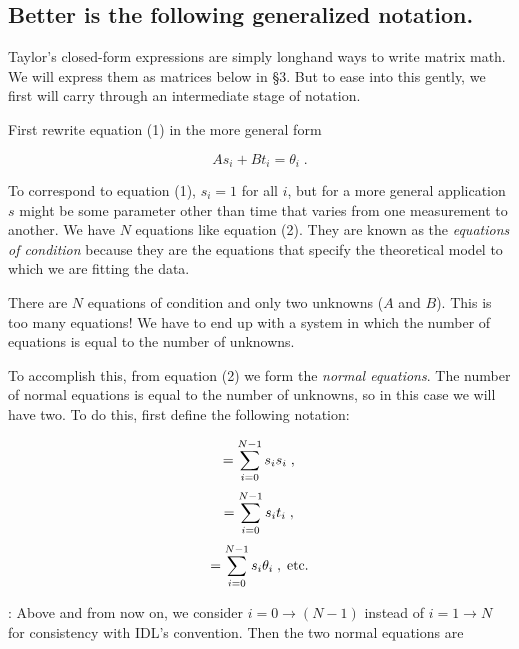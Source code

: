 \subsection{Better is the following generalized notation.}

	Taylor's closed-form expressions are simply longhand ways to
write matrix math.  We will express them as matrices below in \S 3.  But
to ease into this gently, we first will carry through an intermediate
stage of notation. 

	First rewrite equation (1) in the more general form

\begin{equation}
A s_i + B t_i = \theta_i \; .
\end{equation}

\noindent To correspond to equation (1), $s_i = 1$ for all $i$, but for
a more general application $s$ might be some parameter other than time
that varies from one measurement to another.  We have $N$ equations like
equation (2).  They are known as the {\it equations of condition}
because they are the equations that specify the theoretical model to
which we are fitting the data. 

	There are $N$ equations of condition and only two unknowns ($A$
and $B$).  This is too many equations! We have to end up with a system
in which the number of equations is equal to the number of unknowns.

	To accomplish this, from equation (2) we form the {\it normal
equations}.  The number of normal equations is equal to the number of
unknowns, so in this case we will have two.  To do this, first define
the following notation:

\begin{mathletters}
\label{sseqn}
\begin{equation} 
[ss] = \sum_{i=0}^{N-1} s_i s_i \;, \\ 
\end{equation} 
\begin{equation} [st] = \sum_{i=0}^{N-1} s_i t_i \; , \\
\end{equation} 
\begin{equation} [s\theta] = \sum_{i=0}^{N-1} s_i \theta_i \;, \; {\rm etc.} 
\end{equation} 
\end{mathletters}

: Above and from now on, we consider $i = 0
\rightarrow (N-1)$ instead of $i = 1 \rightarrow N$ for consistency with
IDL's convention.  Then the two normal equations are

